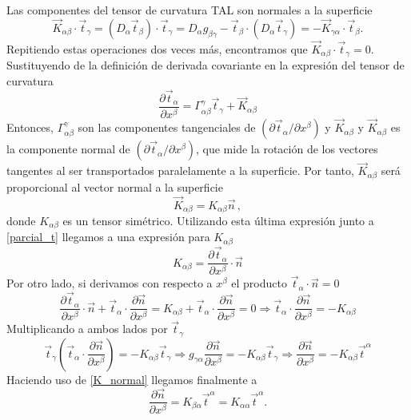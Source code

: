 Las componentes del tensor de curvatura TAL son normales a la superficie
\begin{equation}\label{K_normal}
\vec{K}_{\alpha\beta}\cdot \vec{t}_{\gamma}=(D_{\alpha}\vec{t}_{\beta})\cdot\vec{t}_{\gamma}=D_{\alpha}g_{\beta\gamma}-\vec{t}_{\beta}\cdot(D_{\alpha}\vec{t}_{\gamma})=-\vec{K}_{\gamma\alpha}\cdot \vec{t}_{\beta}.
\end{equation}
Repitiendo estas operaciones dos veces más, encontramos que
$\vec{K}_{\alpha\beta}\cdot \vec{t}_{\gamma}=0$. Sustituyendo de la definición de
derivada covariante en la expresión del tensor de curvatura
\begin{equation}\label{parcial_t}
\frac{\partial \vec{t}_{\alpha}}{\partial x^{\beta}}=\Gamma^{\gamma}_{\alpha\beta}\vec{t}_{\gamma}+\vec{K}_{\alpha\beta}
\end{equation}
Entonces, $\Gamma^{\gamma}_{\alpha\beta}$ son las componentes tangenciales de
$(\partial \vec{t}_{\alpha}/\partial x^{\beta})$ y $\vec{K}_{\alpha\beta}$ y 
$\vec{K}_{\alpha\beta}$ es la componente normal de $(\partial
\vec{t}_{\alpha}/\partial x^{\beta})$, que mide la rotación de los vectores
tangentes al ser transportados paralelamente a la superficie. Por tanto,
 $\vec{K}_{\alpha\beta}$ será proporcional al vector normal a la superficie
\begin{equation*}
 \vec{K}_{\alpha\beta}=K_{\alpha\beta}\vec{n}\, ,
\end{equation*}
donde $K_{\alpha\beta}$ es un tensor simétrico. Utilizando esta última
expresión junto a \eqref{parcial_t} llegamos a una expresión para
$K_{\alpha\beta}$
\begin{equation}\label{K_alfa_beta}
K_{\alpha\beta}=\frac{\partial \vec{t}_{\alpha}}{\partial x^{\beta}}\cdot\vec{n} 
\end{equation}
Por otro lado, si derivamos con respecto a $x^{\beta}$ el producto $\vec{t}_{\alpha}\cdot\vec{n}=0$
\begin{equation*}
\frac{\partial \vec{t}_{\alpha}}{\partial x^{\beta}}\cdot\vec{n}+
\vec{t}_{\alpha}\cdot\frac{\partial \vec{n}}{\partial x^{\beta}}=
K_{\alpha\beta}+\vec{t}_{\alpha}\cdot\frac{\partial \vec{n}}{\partial x^{\beta}}=0
\Rightarrow \vec{t}_{\alpha}\cdot\frac{\partial \vec{n}}{\partial x^{\beta}}=-K_{\alpha\beta}
\end{equation*}
Multiplicando a ambos lados por $\vec{t}_{\gamma}$
\begin{equation}
\vec{t}_{\gamma}\left(\vec{t}_{\alpha}\cdot\frac{\partial \vec{n}}{\partial
    x^{\beta}}\right)=-K_{\alpha\beta}\vec{t}_{\gamma}\Rightarrow 
g_{\gamma\alpha}\frac{\partial \vec{n}}{\partial x^{\beta}}=-K_{\alpha\beta}\vec{t}_{\gamma}\Rightarrow\frac{\partial \vec{n}}{\partial x^{\beta}}=-K_{\alpha\beta}\vec{t}^{\alpha}
\end{equation}
Haciendo uso de \eqref{K_normal} llegamos finalmente a 
\begin{equation}
\frac{\partial \vec{n}}{\partial x^{\beta}}=K_{\beta\alpha}\vec{t}^{\alpha}=K_{\alpha\alpha}\vec{t}^{\alpha}.
\end{equation}

